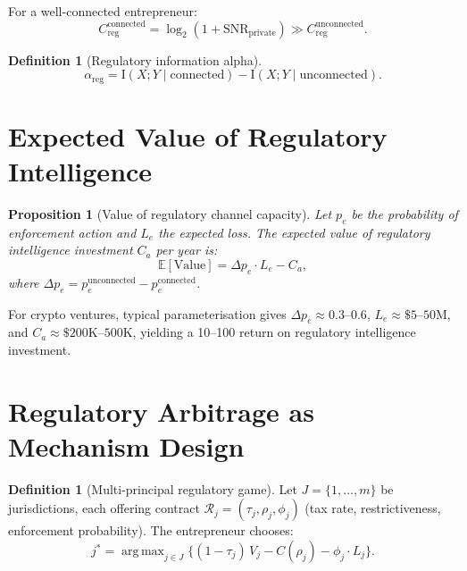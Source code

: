 \documentclass[12pt,a4paper,oneside]{book}
\newtheorem{proposition}[theorem]{Proposition}
\theoremstyle{definition}
\newtheorem{definition}[theorem]{Definition}
\theoremstyle{remark}
\newcommand{\E}{\mathbb{E}}
\newcommand{\MI}{\mathrm{I}}
\newcommand{\argmax}{\operatorname{arg\,max}}
\begin{document}
For a well-connected entrepreneur:
\begin{equation}\label{eq:high_capacity}
  C_{\text{reg}}^{\text{connected}} = \log_2(1 + \text{SNR}_{\text{private}})
  \gg C_{\text{reg}}^{\text{unconnected}}.
\end{equation}

\begin{definition}[Regulatory information alpha]
\begin{equation}\label{eq:reg_alpha}
  \alpha_{\text{reg}} = \MI(X; Y \mid \text{connected})
  - \MI(X; Y \mid \text{unconnected}).
\end{equation}
\end{definition}

\section{Expected Value of Regulatory Intelligence}

\begin{proposition}[Value of regulatory channel capacity]\label{prop:reg_value}
Let $p_e$ be the probability of enforcement action and $L_e$ the expected loss. The
expected value of regulatory intelligence investment $C_a$ per year is:
\begin{equation}\label{eq:reg_ev}
  \E[\text{Value}] = \Delta p_e \cdot L_e - C_a,
\end{equation}
where $\Delta p_e = p_e^{\text{unconnected}} - p_e^{\text{connected}}$.
\end{proposition}

For crypto ventures, typical parameterisation gives $\Delta p_e \approx 0.3$--$0.6$,
$L_e \approx \$5$--$50$M, and $C_a \approx \$200$K--$500$K, yielding a 10--100\texttimes{}
return on regulatory intelligence investment.

\section{Regulatory Arbitrage as Mechanism Design}

\begin{definition}[Multi-principal regulatory game]
Let $J = \{1, \ldots, m\}$ be jurisdictions, each offering contract
$\mathcal{R}_j = (\tau_j, \rho_j, \phi_j)$ (tax rate, restrictiveness, enforcement
probability). The entrepreneur chooses:
\begin{equation}\label{eq:jurisd_opt}
  j^* = \argmax_{j \in J} \bigl\{
    (1 - \tau_j)\,V_j - C(\rho_j) - \phi_j \cdot L_j
  \bigr\}.
\end{equation}
\end{definition}
\end{document}
